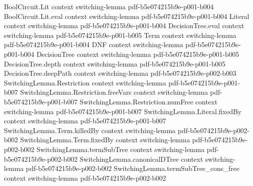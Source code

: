 \begin{lemma}
\label{SwitchingLemma.canonicalDTree_deepPath_match_freeLits}
\leanok
{}
\proofstep
  {BoolCircuit.Lit}
  {context}
  {switching-lemma}
  {pdf-b5e074215b9e-p001-b004}
\proofstep
  {BoolCircuit.Lit.eval}
  {context}
  {switching-lemma}
  {pdf-b5e074215b9e-p001-b004}
\proofstep
  {Literal}
  {context}
  {switching-lemma}
  {pdf-b5e074215b9e-p001-b004}
\proofstep
  {DecisionTree.eval}
  {context}
  {switching-lemma}
  {pdf-b5e074215b9e-p001-b005}
\proofstep
  {Term}
  {context}
  {switching-lemma}
  {pdf-b5e074215b9e-p001-b004}
\proofstep
  {DNF}
  {context}
  {switching-lemma}
  {pdf-b5e074215b9e-p001-b004}
\proofstep
  {DecisionTree}
  {context}
  {switching-lemma}
  {pdf-b5e074215b9e-p001-b005}
\proofstep
  {DecisionTree.depth}
  {context}
  {switching-lemma}
  {pdf-b5e074215b9e-p001-b005}
\proofstep
  {DecisionTree.deepPath}
  {context}
  {switching-lemma}
  {pdf-b5e074215b9e-p002-b003}
\proofstep
  {SwitchingLemma.Restriction}
  {context}
  {switching-lemma}
  {pdf-b5e074215b9e-p001-b007}
\proofstep
  {SwitchingLemma.Restriction.freeVars}
  {context}
  {switching-lemma}
  {pdf-b5e074215b9e-p001-b007}
\proofstep
  {SwitchingLemma.Restriction.numFree}
  {context}
  {switching-lemma}
  {pdf-b5e074215b9e-p001-b007}
\proofstep
  {SwitchingLemma.Literal.fixedBy}
  {context}
  {switching-lemma}
  {pdf-b5e074215b9e-p001-b007}
\proofstep
  {SwitchingLemma.Term.killedBy}
  {context}
  {switching-lemma}
  {pdf-b5e074215b9e-p002-b002}
\proofstep
  {SwitchingLemma.Term.fixedBy}
  {context}
  {switching-lemma}
  {pdf-b5e074215b9e-p002-b002}
\proofstep
  {SwitchingLemma.termSubTree}
  {context}
  {switching-lemma}
  {pdf-b5e074215b9e-p002-b002}
\proofstep
  {SwitchingLemma.canonicalDTree}
  {context}
  {switching-lemma}
  {pdf-b5e074215b9e-p002-b002}
\proofstep
  {SwitchingLemma.termSubTree_cons_free}
  {context}
  {switching-lemma}
  {pdf-b5e074215b9e-p002-b002}

\end{lemma}
